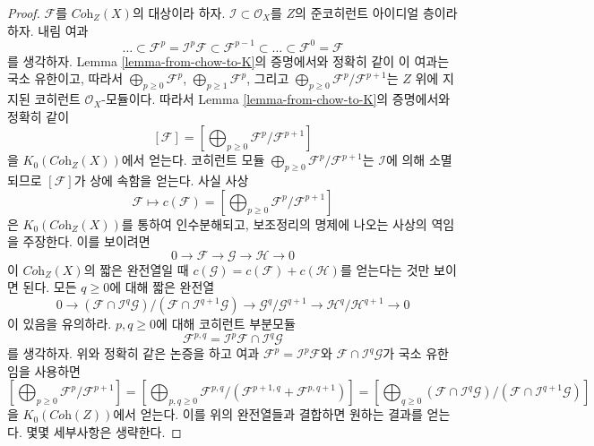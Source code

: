 \begin{proof}
$\mathcal{F}$를 $\textit{Coh}_Z(X)$의 대상이라 하자.
$\mathcal{I} \subset \mathcal{O}_X$를 $Z$의 준코히런트 아이디얼 층이라
하자. 내림 여과
$$
\ldots \subset
\mathcal{F}^p = \mathcal{I}^p \mathcal{F} \subset
\mathcal{F}^{p - 1} \subset \ldots \subset \mathcal{F}^0 = \mathcal{F}
$$
를 생각하자. Lemma \ref{lemma-from-chow-to-K}의 증명에서와 정확히 같이
이 여과는 국소 유한이고, 따라서
$\bigoplus_{p \geq 0} \mathcal{F}^p$,
$\bigoplus_{p \geq 1} \mathcal{F}^p$, 그리고
$\bigoplus_{p \geq 0} \mathcal{F}^p/\mathcal{F}^{p + 1}$는 $Z$ 위에
지지된 코히런트 $\mathcal{O}_X$-모듈이다. 따라서 Lemma
\ref{lemma-from-chow-to-K}의 증명에서와 정확히 같이
$$
[\mathcal{F}] =
[\bigoplus\nolimits_{p \geq 0} \mathcal{F}^p/\mathcal{F}^{p + 1}]
$$
을 $K_0(\textit{Coh}_Z(X))$에서 얻는다. 코히런트 모듈
$\bigoplus_{p \geq 0} \mathcal{F}^p/\mathcal{F}^{p + 1}$는
$\mathcal{I}$에 의해 소멸되므로 $[\mathcal{F}]$가 상에 속함을 얻는다.
사실 사상
$$
\mathcal{F} \longmapsto 
c(\mathcal{F}) =
[\bigoplus\nolimits_{p \geq 0} \mathcal{F}^p/\mathcal{F}^{p + 1}]
$$
은 $K_0(\textit{Coh}_Z(X))$를 통하여 인수분해되고, 보조정리의 명제에
나오는 사상의 역임을 주장한다. 이를 보이려면
$$
0 \to \mathcal{F} \to \mathcal{G} \to \mathcal{H} \to 0
$$
이 $\textit{Coh}_Z(X)$의 짧은 완전열일 때
$c(\mathcal{G}) = c(\mathcal{F}) + c(\mathcal{H})$를 얻는다는 것만
보이면 된다. 모든 $q \geq 0$에 대해 짧은 완전열
$$
0 \to
(\mathcal{F} \cap \mathcal{I}^q\mathcal{G})/
(\mathcal{F} \cap \mathcal{I}^{q + 1}\mathcal{G}) \to
\mathcal{G}^q/\mathcal{G}^{q + 1} \to
\mathcal{H}^q/\mathcal{H}^{q + 1} \to 0
$$
이 있음을 유의하라. $p, q \geq 0$에 대해 코히런트 부분모듈
$$
\mathcal{F}^{p, q} = \mathcal{I}^p\mathcal{F} \cap \mathcal{I}^q\mathcal{G}
$$
를 생각하자. 위와 정확히 같은 논증을 하고 여과
$\mathcal{F}^p = \mathcal{I}^p\mathcal{F}$와
$\mathcal{F} \cap \mathcal{I}^q\mathcal{G}$가 국소 유한임을 사용하면
$$
[\bigoplus\nolimits_{p \geq 0} \mathcal{F}^p/\mathcal{F}^{p + 1}] =
[\bigoplus\nolimits_{p, q \geq 0}
\mathcal{F}^{p, q}/(\mathcal{F}^{p + 1, q} + \mathcal{F}^{p, q + 1})] =
[\bigoplus\nolimits_{q \geq 0}
(\mathcal{F} \cap \mathcal{I}^q\mathcal{G})/
(\mathcal{F} \cap \mathcal{I}^{q + 1}\mathcal{G})]
$$
을 $K_0(\textit{Coh}(Z))$에서 얻는다. 이를 위의 완전열들과 결합하면
원하는 결과를 얻는다. 몇몇 세부사항은 생략한다.
\end{proof}













